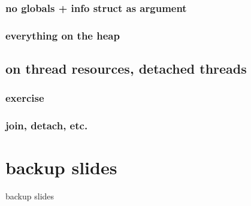 \subsubsection{no globals + info struct as argument}



\subsubsection{everything on the heap}



\subsection{on thread resources, detached threads}

\subsubsection{exercise}


\subsubsection{join, detach, etc.}






\section{backup slides}
\begin{frame}{backup slides}
\end{frame}


